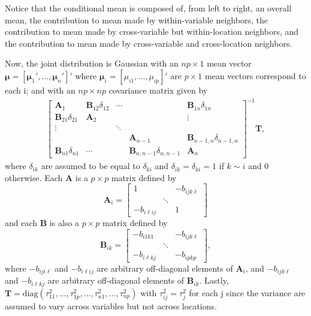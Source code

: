 \documentclass{article}
\begin{document}
Notice that the conditional mean is composed of, from left to right, an overall mean, the contribution to mean made by within-variable neighbors, the contribution to mean made by cross-variable but within-location neighbors, and the contribution to mean made by cross-variable and cross-location neighbors.

Now, the joint distribution is Gaussian with an $np \times 1$ mean vector 
$\boldsymbol{\mu} = [\boldsymbol{\mu}_1' , \dots, \boldsymbol{\mu}_n']'$ where $\boldsymbol{\mu}_i = [\mu_{i1}, \dots, \mu_{ip}]'$ are $p \times 1$ mean vectors correspond to each i; 
and with an $np \times np$ covariance matrix given by
\begin{eqnarray*}
    \begin{bmatrix}
        \boldsymbol{A}_1 & \boldsymbol{B}_{12} \delta_{12} & \cdots & & \boldsymbol{B}_{1n}\delta_{1n} \\
        \boldsymbol{B}_{21}\delta_{21} & \boldsymbol{A}_2 & & & \vdots \\
        \vdots & & \ddots &  & \\
        & & & \boldsymbol{A}_{n-1} & \boldsymbol{B}_{n-1, n}\delta_{n-1, n} \\
        \boldsymbol{B}_{n1}\delta_{n1} & \cdots &  & \boldsymbol{B}_{n, n-1}\delta_{n, n-1} &  \boldsymbol{A}_n
    \end{bmatrix}^{-1} \boldsymbol{T},
\end{eqnarray*}
where $\delta_{ik}$ are assumed to be equal to $\delta_{ki}$ and  $\delta_{ik} = \delta_{ki} = 1$ if $k \sim i$ and 0 otherwise. 
Each $\boldsymbol{A}$ is a $p\times p$ matrix defined by
$$
    \boldsymbol{A}_i = \begin{bmatrix}
        1 &  & -b_{ijk\ell} \\
         & \ddots  &  \\
        -b_{i\ell ij} &  & 1 
    \end{bmatrix}
$$
and each $\boldsymbol{B}$ is also a $p\times p$ matrix defined by
$$
\boldsymbol{B}_{ik} = \begin{bmatrix}
        -b_{i1k1} &  & -b_{ijk\ell} \\
         & \ddots  &  \\
        -b_{i\ell kj} &  & -b_{ipkp}
    \end{bmatrix},
$$
where $-b_{iji\ell}$ and $-b_{i\ell ij}$ are arbitrary off-diagonal elements of $\boldsymbol{A}_i$, and $-b_{ijk\ell}$ and $-b_{i\ell kj}$ are arbitrary off-diagonal elements of $\boldsymbol{B}_{ik}$. Lastly, $\boldsymbol{T} = \text{diag}(\tau_{11}^2, \dots, \tau_{1p}^2, \dots, \tau_{n1}^2, \dots, \tau_{np}^2)$ with $\tau_{ij}^2 = \tau_{j}^2$ for each j since the variance are assumed to vary across variables but not across locations. 
\end{document}
